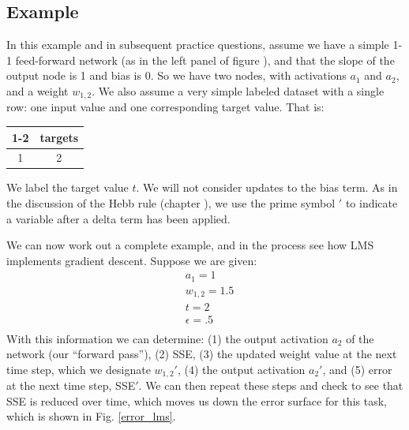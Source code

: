 

\subsection{Example}\label{lms_example}

In this example and in subsequent practice questions, assume we have a  simple 1-1 feed-forward network  (as in the left panel of figure ), and that the slope of the output node is 1 and bias is 0. So we have two nodes, with activations $a_1$ and $a_2$, and a weight $w_{1,2}$. We also assume a very simple labeled dataset with a single row: one input value and one corresponding target value. That is:
\begin{center}
\begin{tabular}{| c || c | }
\cline{1-2}
\multicolumn{1}{| c || }{inputs}
 & \multicolumn{1}{c|}{targets} \\
\hline
  1 & 2  \\
\hline
\end{tabular}
\end{center}
We label the target value $t$. We will not consider updates to the bias term. As in the discussion of the Hebb rule (chapter ), we use the prime symbol $'$ to indicate a variable after a delta term has been applied.

We can now work out a complete example, and in the process see how LMS implements gradient descent. Suppose we are given:
\begin{eqnarray*}
& a_1 = 1 \\
& w_{1,2} = 1.5 \\
& t = 2  \\
& \epsilon = .5  \\
\end{eqnarray*}
With this information we can determine: (1) the output activation $a_2$ of the network (our ``forward pass''), (2) SSE, (3) the updated weight value at the next time step, which we designate $w_{1,2}'$, (4) the output activation $a_2'$, and (5) error at the next time step, SSE$'$. We can then repeat these steps and check to see that SSE is reduced over time, which moves us down the error surface for this task, which is shown in Fig. \ref{error_lms}.

